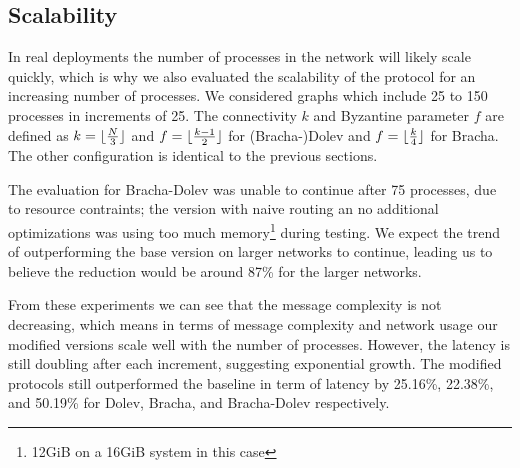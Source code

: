 \subsection{Scalability}
In real deployments the number of processes in the network will likely scale quickly, which is why we also evaluated the scalability of the protocol for an increasing number of processes. We considered graphs which include 25 to 150 processes in increments of 25. The connectivity $k$ and Byzantine parameter $f$ are defined as $k=\lfloor\frac{N}{3}\rfloor$ and $f=\lfloor\frac{k-1}{2}\rfloor$ for (Bracha-)Dolev and $f=\lfloor\frac{k}{4}\rfloor$ for Bracha. The other configuration is identical to the previous sections.

The evaluation for Bracha-Dolev was unable to continue after 75 processes, due to resource contraints; the version with naive routing an no additional optimizations was using too much memory\footnote{12GiB on a 16GiB system in this case} during testing. 
We expect the trend of outperforming the base version on larger networks to continue, leading us to believe the reduction would be around 87\% for the larger networks.

From these experiments we can see that the message complexity is not decreasing, which means in terms of message complexity and network usage our modified versions scale well with the number of processes. However, the latency is still doubling after each increment, suggesting exponential growth. The modified protocols still outperformed the baseline in term of latency by 25.16\%, 22.38\%, and 50.19\% for Dolev, Bracha, and Bracha-Dolev respectively.


